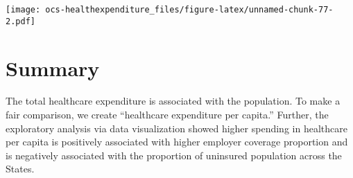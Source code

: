 \documentclass[]{article}
\begin{document}
\texttt{[image: ocs-healthexpenditure\_files/figure-latex/unnamed-chunk-77-2.pdf]}

\hypertarget{summary}{%
\section{Summary}\label{summary}}

The total healthcare expenditure is associated with the population. To
make a fair comparison, we create ``healthcare expenditure per capita.''
Further, the exploratory analysis via data visualization showed higher
spending in healthcare per capita is positively associated with higher
employer coverage proportion and is negatively associated with the
proportion of uninsured population across the States.
\end{document}
